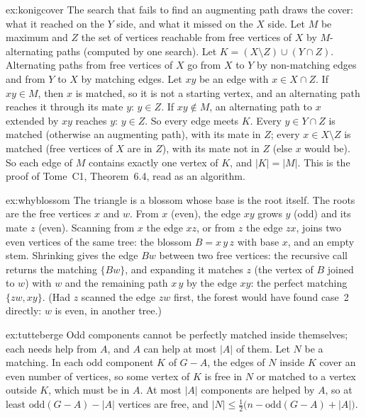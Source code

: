 \begin{solution}{ex:konigcover}
\idea The search that fails to find an augmenting path draws the cover: what it reached on the $Y$ side, and what it missed on the $X$ side.
\writeup Let $M$ be maximum and $Z$ the set of vertices reachable from free vertices of $X$ by $M$-alternating paths (computed by one search). Let $K=(X\setminus Z)\cup(Y\cap Z)$. Alternating paths from free vertices of $X$ go from $X$ to $Y$ by non-matching edges and from $Y$ to $X$ by matching edges. Let $xy$ be an edge with $x\in X\cap Z$. If $xy\in M$, then $x$ is matched, so it is not a starting
vertex, and an alternating path reaches it through its mate $y$: $y\in Z$. If $xy\notin M$, an alternating path to $x$ extended by $xy$ reaches $y$: $y\in Z$. So every edge meets $K$. Every $y\in Y\cap Z$ is matched (otherwise an augmenting path), with its mate in $Z$; every $x\in X\setminus Z$ is matched (free vertices of $X$ are in $Z$), with its mate
not in $Z$ (else $x$ would be). So each edge of $M$ contains exactly one vertex of $K$, and $|K|=|M|$. This is the proof of Tome~C1, Theorem~6.4, read as an algorithm.
\end{solution}

\begin{solution}{ex:whyblossom}
\idea The triangle is a blossom whose base is the root itself.
\writeup The roots are the free vertices $x$ and $w$. From $x$ (even), the edge $xy$ grows $y$ (odd) and its mate $z$ (even). Scanning from $x$ the edge $xz$, or from $z$ the edge $zx$, joins two even vertices of the same tree: the blossom $B=x\,y\,z$ with base $x$, and an empty stem.
Shrinking gives the edge $Bw$ between two free vertices: the recursive call returns the matching $\{Bw\}$, and expanding it matches $z$ (the vertex of $B$ joined to $w$) with $w$ and the remaining path $x\,y$ by the edge $xy$: the perfect matching $\{zw,xy\}$. (Had $z$ scanned
the edge $zw$ first, the forest would have found case~2 directly: $w$ is even, in another tree.)
\end{solution}

\begin{solution}{ex:tutteberge}
\idea Odd components cannot be perfectly matched inside themselves; each needs help from $A$, and $A$ can help at most $|A|$ of them.
\writeup Let $N$ be a matching. In each odd component $K$ of $G-A$, the edges of $N$ inside $K$ cover an even number of vertices, so some vertex of $K$ is free in $N$ or matched to a vertex outside $K$, which must be in $A$. At most $|A|$ components are helped by $A$, so at least
$\mathrm{odd}(G-A)-|A|$ vertices are free, and $|N|\le\frac12\big(n-\mathrm{odd}(G-A)+|A|\big)$.
\end{solution}


